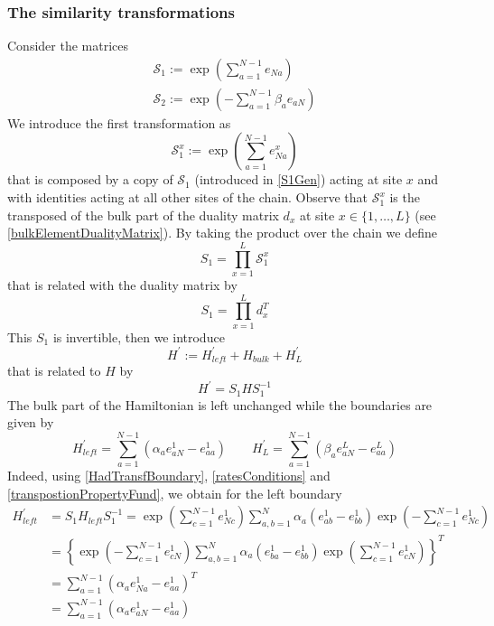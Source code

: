 \documentclass[10pt]{article}
\numberwithin{equation}{section}
\numberwithin{equation}{subsection}
\begin{document}
\subsubsection{The similarity transformations}\label{subsectionSTransf}
Consider the matrices
\begin{align}
	\mathcal{S}_{1}:=\exp{\left(\sum_{a=1}^{N-1}e_{Na}\right)}\label{S1Gen}\\
	\mathcal{S}_{2}:=\exp{\left(-\sum_{a=1}^{N-1}\beta_{a}e_{aN}\right)}\label{S2Gen}
\end{align}
We introduce the first transformation as
\begin{equation}\label{transformationV}
 \mathcal{S}_{1}^{x}:=\exp{\left(\sum_{a=1}^{N-1}e_{Na}^{x}\right)}%
\end{equation}
that is composed by a copy of $\mathcal{S}_{1}$ (introduced in \eqref{S1Gen}) acting at site $x$ and with identities acting at all other sites of the chain. 
Observe that $\mathcal{S}_{1}^{x}$ is the transposed of the bulk part of the duality matrix $d_{x}$  at site $x\in \{1,\ldots,L\}$ (see \eqref{bulkElementDualityMatrix}). By taking the product over the chain we define
\begin{equation}\label{S1-Whole}
    S_{1}=\prod_{x=1}^{L}\mathcal{S}_{1}^{x}
\end{equation}
that is related with the duality matrix by 
\begin{equation}
S_{1}=\prod_{x=1}^{L}d_{x}^{T}
\end{equation}
 This $S_{1}$ is invertible, then we introduce 
\begin{equation}\label{hatHamiltonian}
   H^{'}:=H^{'}_{left}+H_{bulk}+H^{'}_{L}
\end{equation}
that is related to $H$ by
\begin{equation}\label{similarV}
   H^{'}=S_{1}HS_{1}^{-1}
\end{equation}
The bulk part of the Hamiltonian is left unchanged while the boundaries are given by 
\begin{equation}
	H^{'}_{left}=\sum_{a=1}^{N-1}\left(\alpha_{a}e_{aN}^{1}-e_{aa}^{1}\right)\qquad H^{'}_{L}=\sum_{a=1}^{N-1}\left(\beta_{a}e_{aN}^{L}-e_{aa}^{L}\right)
\end{equation}
Indeed, using \eqref{HadTransfBoundary}, \eqref{ratesConditions} and \eqref{transpostionPropertyFund}, we obtain for the left boundary
\begin{equation}
	\begin{split}
		H_{left}^{'}&=S_{1}H_{left}S_{1}^{-1}=\exp{\left(\sum_{c=1}^{N-1}e_{Nc}^{1}\right)}\sum_{a,b=1}^{N}\alpha_{a}\left(e_{ab}^{1}-e_{bb}^{1}\right)\exp{\left(-\sum_{c=1}^{N-1}e_{Nc}^{1}\right)}
		\\&=
		\left\{\exp{\left(-\sum_{c=1}^{N-1}e_{cN}^{1}\right)}\sum_{a,b=1}^{N}\alpha_{a}\left(e_{ba}^{1}-e_{bb}^{1}\right)\exp{\left(\sum_{c=1}^{N-1}e_{cN}^{1}\right)}\right\}^{T}
		\\&=
		\sum_{a=1}^{N-1}\left(\alpha_{a}e_{Na}^{1}-e_{aa}^{1}\right)^{T}
		\\&=
		\sum_{a=1}^{N-1}\left(\alpha_{a}e_{aN}^{1}-e_{aa}^{1}\right)
	\end{split}
\end{equation}
\end{document}
